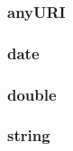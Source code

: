 \documentclass{article}
\begin{document}
\subsubsection*{anyURI}

\subsubsection*{date}

\subsubsection*{double}

\subsubsection*{string}
\end{document}
